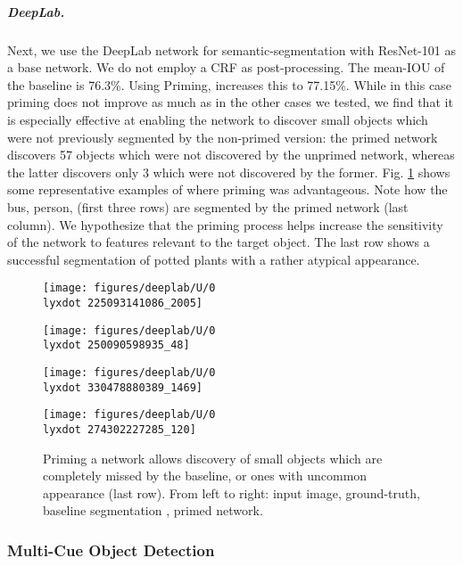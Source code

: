 \documentclass[10pt,letterpaper,twocolumn]{article}
\newcommand{\lyxdot}{.}
\begin{document}
\subparagraph{DeepLab.}

Next, we use the DeepLab \cite{chen2016deeplab} network for semantic-segmentation
with ResNet-101 \cite{he2016deep} as a base network. We do not employ
a CRF as post-processing. The mean-IOU of the baseline is 76.3\%.
Using Priming, increases this to 77.15\%. While in this case priming
does not improve as much as in the other cases we tested, we find
that it is especially effective at enabling the network to discover
small objects which were not previously segmented by the non-primed
version: the primed network discovers 57 objects which were not discovered
by the unprimed network, whereas the latter discovers only 3 which
were not discovered by the former. Fig. \ref{fig:Priming-a-network}
shows some representative examples of where priming was advantageous.
Note how the bus, person, (first three rows) are segmented by the
primed network (last column). We hypothesize that the priming process
helps increase the sensitivity of the network to features relevant
to the target object. The last row shows a successful segmentation
of potted plants with a rather atypical appearance. 

\begin{figure}
\texttt{[image: figures/deeplab/U/0\\lyxdot 225093141086\_2005]}

\texttt{[image: figures/deeplab/U/0\\lyxdot 250090598935\_48]}

\texttt{[image: figures/deeplab/U/0\\lyxdot 330478880389\_1469]}

\texttt{[image: figures/deeplab/U/0\\lyxdot 274302227285\_120]}

\caption{\label{fig:Priming-a-network}Priming a network allows discovery of
small objects which are completely missed by the baseline, or ones
with uncommon appearance (last row). From left to right: input image,
ground-truth, baseline segmentation \cite{chen2016deeplab}, primed
network. }

\end{figure}

\subsubsection{Multi-Cue Object Detection}
\end{document}
